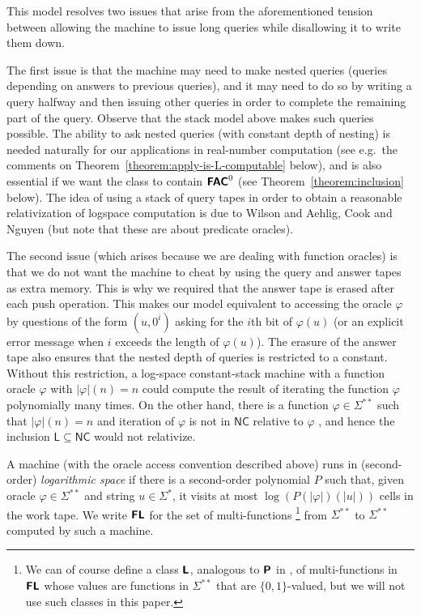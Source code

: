 \documentclass[envcountsect,envcountsame,orivec,oribibl]{llncs}
\newcommand{\classonefont}[1]{\mathsf{#1}}
\newcommand{\classL}{\classonefont{L}}
\newcommand{\classNC}{\classonefont{NC}}
\newcommand{\classtwofont}[1]{\text{\bfseries \sffamily \upshape #1}}
\newcommand{\classLtwo}{\classtwofont{L}}
\newcommand{\classFLtwo}{\classtwofont{FL}}
\newcommand{\classFACtwo}{\classtwofont{FAC}}
\newcommand{\classPtwo}{\classtwofont{P}}
\newcommand{\LM}{\varSigma ^{**}}
\begin{document}
This model resolves two issues that arise 
from the aforementioned tension between 
allowing the machine to issue long queries
while disallowing it to write them down. 

The first issue is that 
the machine may need to make nested queries 
(queries depending on answers to previous queries), and 
it may need to do so by writing a query halfway 
and then issuing other queries in order to complete the remaining part of the query.  
Observe that the stack model above makes such queries possible. 
The ability to ask nested queries (with constant depth of nesting) is needed naturally 
for our applications in real-number computation
(see e.g.\ the comments on Theorem~\ref{theorem:apply-is-L-computable} below), 
and is also essential if we want the class to contain
$\classFACtwo ^0$ 
(see Theorem~\ref{theorem:inclusion} below). 
The idea of using a stack of query tapes 
in order to obtain a reasonable relativization of logspace computation
is due to Wilson \cite{wilson1988measure} and 
Aehlig, Cook and Nguyen \cite{aehlig2007relativizing}
(but note that these are about predicate oracles). 

The second issue (which arises because we are dealing with function oracles) is that 
we do not want the machine to cheat by 
using the query and answer tapes as extra memory. 
This is why we required that 
the answer tape is erased after each push operation. 
This makes our model equivalent to 
accessing the oracle $\varphi$ by questions of the form $(u, 0 ^i)$ 
asking for the $i$th bit of $\varphi (u)$ (or an explicit error message 
when $i$ exceeds the length of $\varphi (u)$).
The erasure of the answer tape also
ensures that the nested depth of queries is restricted to a constant.
Without this restriction, a log-space constant-stack machine with 
a function oracle $\varphi$ with $|\varphi|(n) = n$ 
could compute the result of iterating the function $\varphi$ polynomially many times.
On the other hand, there is a function $\varphi \in \LM$ such that $|\varphi|(n) = n$
and iteration of $\varphi$ is not in $\classNC$ relative to $\varphi$ \cite{aehlig2007relativizing}, 
and hence the inclusion $\classL \subseteq \classNC$ would not relativize.

\begin{definition}
 A machine (with the oracle access convention described above) 
 runs in (second-order) \emph{logarithmic space}
 if there is a second-order polynomial $P$ such that, 
 given oracle $\varphi \in \LM$ and string $u \in \varSigma^*$, 
 it visits at most $\log(P(|\varphi|)(|u|))$ cells
 in the work tape.
 We write $\classFLtwo$ for the set of multi-functions%
\footnote{%
We can of course define a class $\classLtwo$, 
analogous to $\classPtwo$ in \cite{kawamura2012complexity}, 
of multi-functions in $\classFLtwo$ whose values are functions in $\LM$ 
that are $\{0, 1\}$-valued, 
but we will not use such classes in this paper. 
}
 from $\LM$ to $\LM$ 
 computed by such a machine.
\end{definition}
\end{document}
